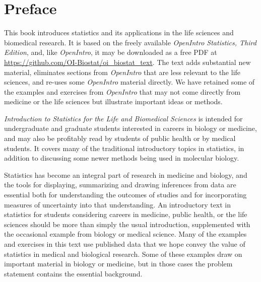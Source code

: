 

\chapter*{Preface}


This book introduces statistics and its applications in the life sciences and biomedical research.  It is based on the freely available \textsl{OpenIntro Statistics, Third Edition}, and, like \textsl{OpenIntro}, it may be downloaded as a free PDF at \url{https://github.com/OI-Biostat/oi_biostat_text}.  The text adds substantial new material, eliminates sections from \textsl{OpenIntro} that are less relevant to the life sciences, and re-uses some \textsl{OpenIntro} material directly. We have retained some of the examples and exercises from \textsl{OpenIntro} that may not come directly from medicine or the life sciences but illustrate important ideas or methods. 

\textsl{Introduction to Statistics for the Life and Biomedical Sciences} is intended for undergraduate and graduate students interested in careers in biology or medicine, and may also be profitably read by students of public health or by medical students.  It covers many of the traditional introductory topics in statistics, in addition to discussing some newer methods being used in molecular biology. 

Statistics has become an integral part of research in medicine and biology, and the tools for displaying, summarizing and drawing inferences from data are essential both for understanding the outcomes of studies and for incorporating measures of uncertainty into that understanding.  An introductory text in statistics for students considering careers in medicine, public health, or the life sciences should be more than simply the usual introduction, supplemented with the occasional example from biology or medical science. Many of the examples and exercises in this text use published data that we hope convey the value of statistics in medical and biological research.  Some of these examples draw on important material in biology or medicine, but in those cases the problem statement contains the essential background. 

